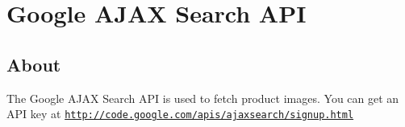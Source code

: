 \hypertarget{searchapi}{}\section{Google AJAX Search API}\label{searchapi}
\hypertarget{searchapi_about}{}\subsection{About}\label{searchapi_about}
The Google AJAX Search API is used to fetch product images. You can get an API key at \href{http://code.google.com/apis/ajaxsearch/signup.html}{\tt http://code.google.com/apis/ajaxsearch/signup.html} 